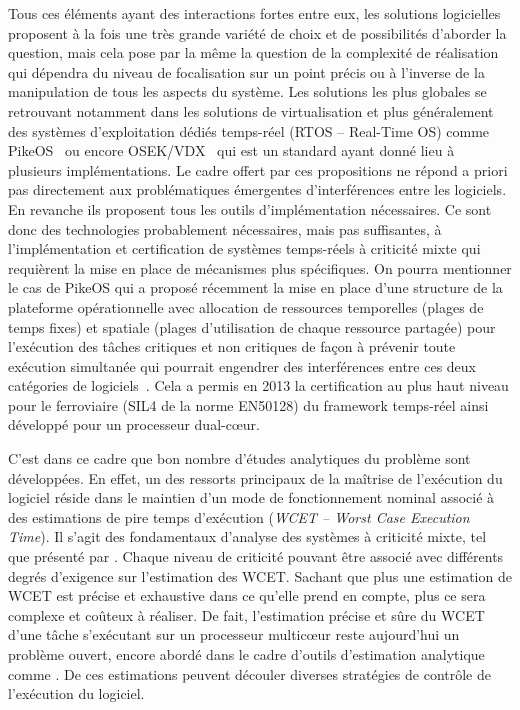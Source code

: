 \documentclass[french, a4paper, 11pt, twoside, pdftex]{StyleThese}
\begin{document}
	Tous ces éléments ayant des interactions fortes entre eux, les solutions logicielles proposent à la fois une très grande variété de choix et de possibilités d'aborder la question, mais cela pose par la même la question de la complexité de réalisation qui dépendra du niveau de focalisation sur un point précis ou à l'inverse de la manipulation de tous les aspects du système. Les solutions les plus globales se retrouvant notamment dans les solutions de virtualisation \cite{augier_real-time_2006} et plus généralement des systèmes d'exploitation dédiés temps-réel (RTOS -- Real-Time OS) comme PikeOS~\cite{kaiser_evolution_2007} ou encore OSEK/VDX~\cite{bechennec_trampoline_2006} qui est un standard ayant donné lieu à plusieurs implémentations. Le cadre offert par ces propositions ne répond a priori pas directement aux problématiques émergentes d'interférences entre les logiciels. En revanche ils proposent tous les outils d'implémentation nécessaires. Ce sont donc des technologies probablement nécessaires, mais pas suffisantes, à l'implémentation et certification de systèmes temps-réels à criticité mixte qui requièrent la mise en place de mécanismes plus spécifiques. On pourra mentionner le cas de PikeOS qui a proposé récemment la mise en place d'une structure de la plateforme opérationnelle avec allocation de ressources temporelles (plages de temps fixes) et spatiale (plages d'utilisation de chaque ressource partagée) pour l'exécution des tâches critiques et non critiques de façon à prévenir toute exécution simultanée qui pourrait engendrer des interférences entre ces deux catégories de logiciels~\cite{sysgo_ag_arinc_2019}. Cela a permis en 2013 la certification au plus haut niveau pour le ferroviaire (SIL4 de la norme EN50128)  du framework temps-réel ainsi développé pour un processeur dual-cœur.
		
	C'est dans ce cadre que bon nombre d'études analytiques du problème sont développées. En effet, un des ressorts principaux de la maîtrise de l'exécution du logiciel réside dans le maintien d'un mode de fonctionnement nominal associé à des estimations de pire temps d'exécution (\textit{WCET -- Worst Case Execution Time}). Il s'agit des fondamentaux d'analyse des systèmes à criticité mixte, tel que présenté par \cite{vestal_preemptive_2007}. Chaque niveau de criticité pouvant être associé avec différents degrés d'exigence sur l'estimation des WCET. Sachant que plus une estimation de WCET est précise et exhaustive dans ce qu'elle prend en compte, plus ce sera complexe et coûteux à réaliser. De fait, l'estimation précise et sûre du WCET d'une tâche s'exécutant sur un processeur multicœur reste aujourd'hui un problème ouvert, encore abordé dans le cadre d'outils d'estimation analytique comme \cite{kastner_timeweaver_2019}. De ces estimations peuvent découler diverses stratégies de contrôle de l'exécution du logiciel.
	
\end{document}
